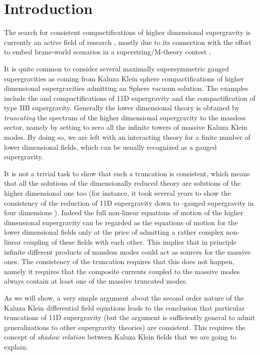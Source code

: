 \documentclass[a4paper,11pt]{article}
\begin{document}
\section{Introduction}
The search for consistent compactifications of higher dimensional
supergravity is currently an active field of research \cite{CLP},
mostly due to its connection with the effort to embed brane-world
scenarios in a superstring/M-theory contest \cite{DLS}.
\par
It is quite common to consider several maximally supersymmetric
gauged supergravities as coming from Kaluza Klein sphere
compactifications of higher dimensional supergravities admitting
an \coordHE{}Sphere vacuum solution. The examples include the
\coordHE{} and \coordHE{} compactifications of 11D supergravity and the
\coordHE{} compactification of type IIB supergravity. Generally the
lower dimensional theory is obtained by \emph{truncating} the
spectrum of the higher dimensional supergravity to the massless
sector, namely by setting to zero all the infinite towers of
massive Kaluza Klein modes. By doing so, we are left with an
interacting theory for a finite number of lower dimensional
fields, which can be usually recognized as a gauged supergravity.
\par
It is not a trivial task to show that such a truncation is
consistent, which means that all the solutions of the
dimensionally reduced theory are solutions of the higher
dimensional one too (for instance, it took several years to show
the consistency of the \coordHE{} reduction of 11D supergravity down to
\coordHE{}  \coordHE{}-gauged supergravity in four dimensions
\cite{dewittnicolai1, dewittnicolai2}). Indeed the full non-linear
equations of motion of the higher dimensional supergravity can be
regarded as the equations of motion for the lower dimensional
fields only at the price of admitting a rather complex non-linear
coupling of these fields with each other. This implies that in
principle infinite different products of massless modes could act
as sources for the massive ones. The consistency of the truncation
requires that this does not happen, namely it requires that the
composite currents coupled to the massive modes always contain at
least one of the massive truncated modes.
\par
As we will show, a very simple argument about the second order
nature of the Kaluza Klein differential field equations leads to
the conclusion that particular truncations of 11D supergravity
(but the argument is sufficiently general to admit generalizations
to other supergravity theories) are consistent. This requires the
concept of \emph{shadow relation} between Kaluza Klein fields that
we are going to explain.
%
%
\end{document}

